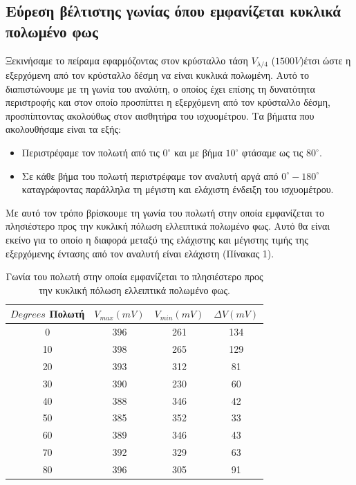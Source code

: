 \documentclass[a4paper,11pt,titlepage]{article}
\newcommand{\degrees}{^{\circ}}
\begin{document}
\subsection{Εύρεση βέλτιστης γωνίας όπου εμφανίζεται κυκλικά πολωμένο φως}
Ξεκινήσαμε το πείραμα εφαρμόζοντας στον κρύσταλλο τάση $V_{\lambda /4}$ ($1500 V$)έτσι ώστε η εξερχόμενη από τον κρύσταλλο δέσμη να είναι κυκλικά πολωμένη. Αυτό το διαπιστώνουμε με τη γωνία του αναλύτη, ο οποίος έχει επίσης τη δυνατότητα περιστροφής και στον οποίο προσπίπτει η εξερχόμενη από τον κρύσταλλο δέσμη, προσπίπτοντας ακολούθως στον αισθητήρα του ισχυομέτρου. 
Τα βήματα που ακολουθήσαμε είναι τα εξής:
\begin{itemize}
\item Περιστρέφαμε τον πολωτή από τις $0\degrees$  και με βήμα $10\degrees$ φτάσαμε ως τις $80\degrees$.
\item Σε κάθε βήμα του πολωτή περιστρέφαμε τον αναλυτή αργά από $0\degrees - 180\degrees$ καταγράφοντας παράλληλα τη μέγιστη και ελάχιστη ένδειξη του ισχυομέτρου.
\end{itemize}
Με αυτό τον τρόπο βρίσκουμε τη γωνία του πολωτή στην οποία εμφανίζεται το πλησιέστερο προς την κυκλική πόλωση ελλειπτικά πολωμένο φως. Αυτό θα είναι εκείνο για το οποίο η διαφορά μεταξύ της ελάχιστης και μέγιστης τιμής της εξερχόμενης έντασης από τον αναλυτή είναι ελάχιστη (Πίνακας 1).

\begin{table} [H]
\centering
\begin{tabular}{|c|c|c|c|}
\hline \rule[-2ex]{0pt}{5.5ex} $Degrees$ Πολωτή & $V_{max} (mV)$ & $V_{min} (mV)$ & $ΔV (mV)$ \\ 
\hline \rule[-2ex]{0pt}{5.5ex} 0 & 396 & 261 & 134 \\
\hline \rule[-2ex]{0pt}{5.5ex} 10 & 398 & 265 & 129 \\
\hline \rule[-2ex]{0pt}{5.5ex} 20 & 393 & 312 & 81 \\
\hline \rule[-2ex]{0pt}{5.5ex} 30 & 390 & 230 & 60 \\
\hline \rule[-2ex]{0pt}{5.5ex} 40 & 388 & 346 & 42 \\
\hline \rule[-2ex]{0pt}{5.5ex} 50 & 385 & 352 & 33 \\
\hline \rule[-2ex]{0pt}{5.5ex} 60 & 389 & 346 & 43 \\
\hline \rule[-2ex]{0pt}{5.5ex} 70 & 392 & 329 & 63\\
\hline \rule[-2ex]{0pt}{5.5ex} 80 & 396 & 305 & 91 \\
\hline 
\end{tabular} 
\caption{Γωνία του πολωτή στην οποία εμφανίζεται το πλησιέστερο προς την κυκλική πόλωση ελλειπτικά πολωμένο φως.}
\end{table}
\end{document}

